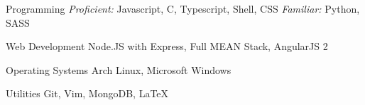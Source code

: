 

\begin{cvskills}

  \cvskill
    {Programming} %
    {\textit{Proficient: } Javascript, C, Typescript, Shell, CSS \hspace{0.3cm}
      \textit{Familiar: } Python, SASS } 

  \cvskill
    {Web Development} %
    {Node.JS with Express, Full MEAN Stack, AngularJS 2} %
    
  \cvskill
    {Operating Systems} %
    {Arch Linux, Microsoft Windows} %

  \cvskill
    {Utilities} %
    {Git, Vim, MongoDB, \LaTeX} %

\end{cvskills}
